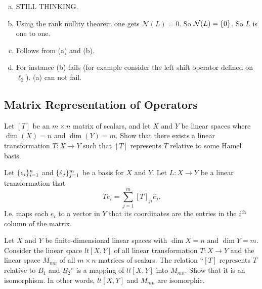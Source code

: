 \begin{solution}
	\begin{enumerate}[(a)]
		\item STILL THINKING.

		
		\item Using the rank nullity theorem one gets $ \mathcal{N} (L)  = 0 $. So $ \mathcal{N}(L) = \{0\} $. So $ L $ is one to one. 
		\item Follows from (a) and (b).
		\item For instance (b) fails (for example consider the left shift operator defined on $ \ell_2 $). (a) can not fail.
 	\end{enumerate}
\end{solution}







\subsection{Matrix Representation of Operators}
\begin{problem}
	Let $ [T] $ be an $ m\times n $ matrix of scalars, and let $ X $ and $ Y $ be linear spaces where $ \dim(X) = n $ and $ \dim(Y) = m $. Show that there exists a linear transformation $ T:X\to Y $ such that $ [T] $ represents $ T $ relative to some Hamel basis.
\end{problem}
\begin{solution}
	Let $ \{e_i\}_{i=1}^n $ and $ \{\hat{e}_j\}_{j=1}^m $ be a basis for $ X $ and $ Y $. Let $ L:X\to Y $ be a linear transformation that
	\[ Te_i = \sum_{j=1}^{m} [T]_{ji} \hat{e}_j. \] 
	I.e. maps each $ e_i $ to a vector in $ Y $ that its coordinates are the entries in the $ i^\text{th} $ column of the matrix.
\end{solution}


\begin{problem}
	Let $ X $ and $ Y $ be finite-dimensional linear spaces with $ \dim X = n $ and $ \dim Y = m $. Consider the linear space $ lt[X,Y] $ of all linear transformation $ T:X\to Y $ and the linear space $ M_{mn} $ of all $ m\times n $ matrices of scalars. The relation ``$ [T] $ represents $ T $ relative to $ B_1 $ and $ B_2 $'' is a mapping of $ lt[X,Y] $ into $ M_{mn} $. Show that it is an isomorphism. In other words, $ lt[X,Y] $ and $ M_{mn} $ are isomorphic.
\end{problem}